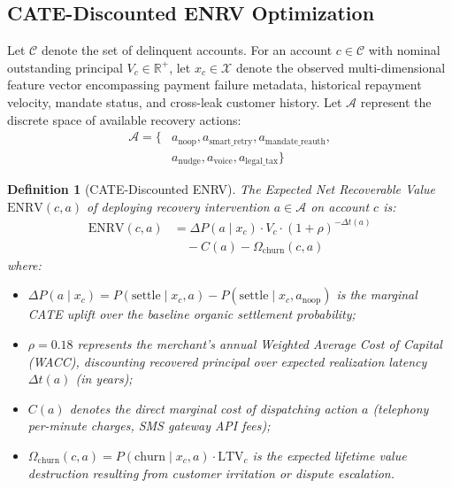 \documentclass[10pt, twocolumn, a4paper]{article}
\newtheorem{definition}{Definition}
\begin{document}
\subsection{CATE-Discounted ENRV Optimization}

Let $\mathcal{C}$ denote the set of delinquent accounts. For an account $c \in \mathcal{C}$ with nominal outstanding principal $V_c \in \mathbb{R}^+$, let $x_c \in \mathcal{X}$ denote the observed multi-dimensional feature vector encompassing payment failure metadata, historical repayment velocity, mandate status, and cross-leak customer history. Let $\mathcal{A}$ represent the discrete space of available recovery actions:
\begin{align}
  \mathcal{A} = \{ & a_{\text{noop}}, a_{\text{smart\_retry}}, a_{\text{mandate\_reauth}}, \nonumber \\
  & a_{\text{nudge}}, a_{\text{voice}}, a_{\text{legal\_tax}} \}
\end{align}

\begin{definition}[CATE-Discounted ENRV]
The Expected Net Recoverable Value $\text{ENRV}(c, a)$ of deploying recovery intervention $a \in \mathcal{A}$ on account $c$ is:
\begin{align}
  \text{ENRV}(c, a) &= \Delta P(a \mid x_c) \cdot V_c \cdot (1 + \rho)^{-\Delta t(a)} \nonumber \\
  &\quad - C(a) - \Omega_{\text{churn}}(c, a)
\end{align}
where:
\begin{itemize}[leftmargin=*]
  \item $\Delta P(a \mid x_c) = P(\text{settle} \mid x_c, a) - P(\text{settle} \mid x_c, a_{\text{noop}})$ is the marginal CATE uplift over the baseline organic settlement probability;
  \item $\rho = 0.18$ represents the merchant's annual Weighted Average Cost of Capital (WACC), discounting recovered principal over expected realization latency $\Delta t(a)$ (in years);
  \item $C(a)$ denotes the direct marginal cost of dispatching action $a$ (telephony per-minute charges, SMS gateway API fees);
  \item $\Omega_{\text{churn}}(c, a) = P(\text{churn} \mid x_c, a) \cdot \text{LTV}_c$ is the expected lifetime value destruction resulting from customer irritation or dispute escalation.
\end{itemize}
\end{definition}
\end{document}
